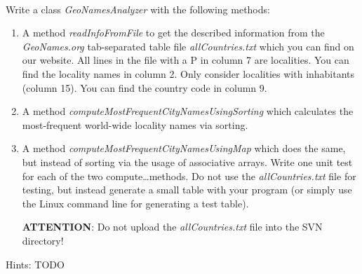  \\
Write a class \textit{GeoNamesAnalyzer} with the following methods:
\begin{enumerate}
  \item
    A method \textit{readInfoFromFile} to get the described information from
    the \textit{GeoNames.org} tab-separated table file \textit{allCountries.txt}
    which you can find on our website.
    All lines in the file with a P in column 7 are localities.
    You can find the locality names in column 2.
    Only consider localities with inhabitants (column 15).
    You can find the country code in column 9.
  \item
    A method \textit{computeMostFrequentCityNamesUsingSorting} which
    calculates the most-frequent world-wide locality names via sorting.
  \item
    A method \textit{computeMostFrequentCityNamesUsingMap} which does the
    same, but instead of sorting via the usage of associative arrays.
    Write one unit test for each of the two compute\ldots methods.
    Do not use the \textit{allCountries.txt} file for testing,
    but instead generate a small table with your program
    (or simply use the Linux command line for generating a test table).
    
    \textbf{ATTENTION}: Do not upload the \textit{allCountries.txt} file into
    the SVN directory!
\end{enumerate}

Hints: TODO